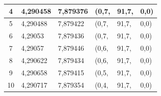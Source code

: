 \begin{table}[!htb]
\begin{tabular}{|c|l|l|l|l|l|}
4                              & {\color[HTML]{000000} 4,290458}                                                                             & {\color[HTML]{000000} 7,879376}                                                                              & {\color[HTML]{000000} (0,7,}    & {\color[HTML]{000000} 91,7,}    & {\color[HTML]{000000} 0,0)}     \\ \hline
5                              & {\color[HTML]{000000} 4,290488}                                                                             & {\color[HTML]{000000} 7,879422}                                                                              & {\color[HTML]{000000} (0,7,}    & {\color[HTML]{000000} 91,7,}    & {\color[HTML]{000000} 0,0)}     \\ \hline
6                              & {\color[HTML]{000000} 4,29053}                                                                              & {\color[HTML]{000000} 7,879436}                                                                              & {\color[HTML]{000000} (0,7,}    & {\color[HTML]{000000} 91,7,}    & {\color[HTML]{000000} 0,0)}     \\ \hline
7                              & {\color[HTML]{000000} 4,29057}                                                                              & {\color[HTML]{000000} 7,879446}                                                                              & {\color[HTML]{000000} (0,6,}    & {\color[HTML]{000000} 91,7,}    & {\color[HTML]{000000} 0,0)}     \\ \hline
8                              & {\color[HTML]{000000} 4,290622}                                                                             & {\color[HTML]{000000} 7,879434}                                                                              & {\color[HTML]{000000} (0,6,}    & {\color[HTML]{000000} 91,7,}    & {\color[HTML]{000000} 0,0)}     \\ \hline
9                              & {\color[HTML]{000000} 4,290658}                                                                             & {\color[HTML]{000000} 7,879415}                                                                              & {\color[HTML]{000000} (0,5,}    & {\color[HTML]{000000} 91,7,}    & {\color[HTML]{000000} 0,0)}     \\ \hline
10                             & {\color[HTML]{000000} 4,290717}                                                                             & {\color[HTML]{000000} 7,879354}                                                                              & {\color[HTML]{000000} (0,4,}    & {\color[HTML]{000000} 91,7,}    & {\color[HTML]{000000} 0,0)}     \\ \hline

\end{tabular}
\end{table}
